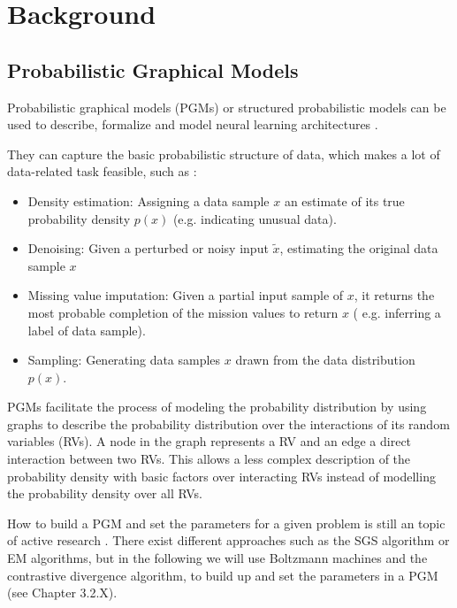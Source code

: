 \chapter{Background}

\section{Probabilistic Graphical Models}

Probabilistic graphical models (PGMs) or structured probabilistic models can be used to describe, formalize and model neural learning architectures \cite{Goodfellow-et-al-2016-Book} \cite{Petrovici2016}.

They can capture the basic probabilistic structure of data, which makes a lot of data-related task feasible, such as \cite{Goodfellow-et-al-2016-Book}:
\begin{itemize}

\item Density estimation: Assigning a data sample $x$ an estimate of its true probability density $p(x)$ (e.g. indicating unusual data).

\item Denoising: Given a perturbed or noisy input $\widetilde{x}$,  estimating the original data sample $x$

\item Missing value imputation: Given a partial input sample of $x$, it returns the most probable completion of the mission values to return $x$ ( e.g. inferring a label of data sample).

\item Sampling: Generating data samples $x$ drawn from the data distribution $p(x)$. 

\end{itemize}  

PGMs facilitate the process of modeling the probability distribution by using graphs to describe the probability distribution over the interactions of its random variables (RVs).
A node in the graph represents a RV and an edge a direct interaction between two RVs.
This allows a less complex description of the probability density with basic factors over interacting RVs instead of modelling the probability density over all RVs. 

How to build a PGM and set the parameters for a given problem is still an topic of active research \cite{Ghahramani2002}\cite{Zhou2007}.
There exist different approaches such as the SGS algorithm \cite{Zhou2007} or EM algorithms\cite{Ghahramani2002}, but in the following we will use Boltzmann machines and the contrastive divergence algorithm, to build up and set the parameters in a PGM (see Chapter 3.2.X).


